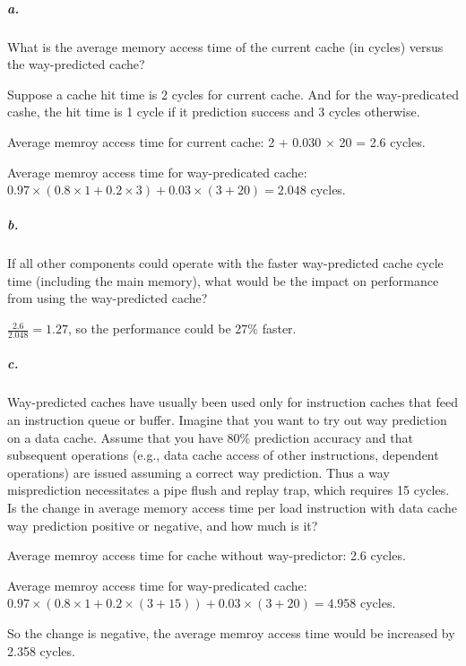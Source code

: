 \documentclass{article}
\begin{document}
\subparagraph{a.} What is the average memory access time of the current cache (in cycles) versus the way-predicted cache?

Suppose a cache hit time is 2 cycles for current cache. And for the way-predicated cashe, the hit time is 1 cycle if it prediction success and 3 cycles otherwise.

Average memroy access time for current cache: 2 + 0.030 $\times$ 20 = 2.6 cycles.

Average memroy access time for way-predicated cache: $0.97\times(0.8\times1+0.2\times3)+0.03\times(3+20)=2.048$ cycles.

\subparagraph{b.} If all other components could operate with the faster way-predicted cache cycle time (including the main memory), what would be the impact on performance from using the way-predicted cache?

$\frac{2.6}{2.048}=1.27$, so the performance could be 27\% faster.

\subparagraph{c.} Way-predicted caches have usually been used only for instruction caches that feed an instruction queue or buffer. Imagine that you want to try out way prediction on a data cache. Assume that you have 80\% prediction accuracy and that subsequent operations (e.g., data cache access of other instructions, dependent operations) are issued assuming a correct way prediction. Thus a way misprediction necessitates a pipe flush and replay trap, which requires 15 cycles. Is the change in average memory access time per load instruction with data cache way prediction positive or negative, and how much is it?

Average memroy access time for cache without way-predictor: 2.6 cycles.

Average memroy access time for way-predicated cache: $0.97\times(0.8\times1+0.2\times(3+15))+0.03\times(3+20)=4.958$ cycles.

So the change is negative, the average memroy access time would be increased by 2.358 cycles.
\end{document}
